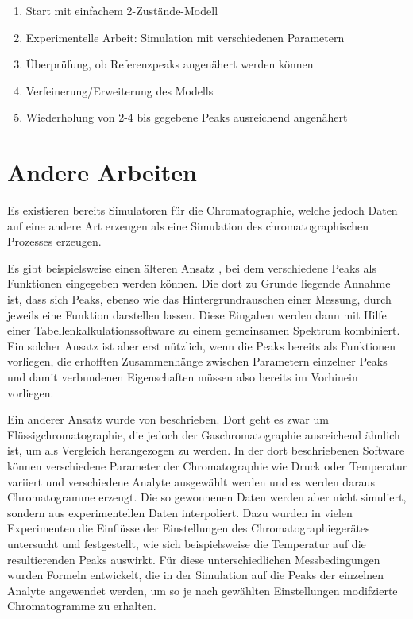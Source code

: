 \begin{enumerate}
 \item Start mit einfachem 2-Zustände-Modell
 \item Experimentelle Arbeit: Simulation mit verschiedenen Parametern
 \item Überprüfung, ob Referenzpeaks angenähert werden können
 \item Verfeinerung/Erweiterung des Modells
 \item Wiederholung von 2-4 bis gegebene Peaks ausreichend angenähert
\end{enumerate}


\section{Andere Arbeiten}
\label{chapter:ein_andere}

Es existieren bereits Simulatoren für die Chromatographie, welche jedoch Daten auf eine andere Art erzeugen als eine Simulation des chromatographischen Prozesses erzeugen.

Es gibt beispielsweise einen älteren Ansatz \citep{spreadsheet}, bei dem verschiedene Peaks als Funktionen eingegeben werden können. Die dort zu Grunde liegende Annahme ist, dass sich Peaks, ebenso wie das Hintergrundrauschen einer Messung, durch jeweils eine Funktion darstellen lassen. Diese Eingaben werden dann mit Hilfe einer Tabellenkalkulationssoftware zu einem gemeinsamen Spektrum kombiniert. Ein solcher Ansatz ist aber erst nützlich, wenn die Peaks bereits als Funktionen vorliegen, die erhofften Zusammenhänge zwischen Parametern einzelner Peaks und damit verbundenen Eigenschaften müssen also bereits im Vorhinein vorliegen.

Ein anderer Ansatz wurde von \citet{hplcsim} beschrieben. Dort geht es zwar um Flüssigchromatographie, die jedoch der Gaschromatographie ausreichend ähnlich ist, um als Vergleich herangezogen zu werden. In der dort beschriebenen Software können verschiedene Parameter der Chromatographie wie Druck oder Temperatur variiert und verschiedene Analyte ausgewählt werden und es werden daraus Chromatogramme erzeugt. Die so gewonnenen Daten werden aber nicht simuliert, sondern aus experimentellen Daten interpoliert. Dazu wurden in vielen Experimenten die Einflüsse der Einstellungen des Chromatographiegerätes untersucht und festgestellt, wie sich beispielsweise die Temperatur auf die resultierenden Peaks auswirkt. Für diese unterschiedlichen Messbedingungen wurden Formeln entwickelt, die in der Simulation auf die Peaks der einzelnen Analyte angewendet werden, um so je nach gewählten Einstellungen modifzierte Chromatogramme zu erhalten.


